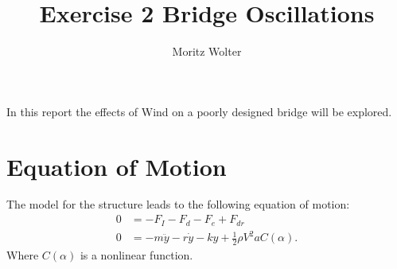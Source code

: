 




\title{Exercise 2 Bridge Oscillations}
\author{Moritz Wolter}

\maketitle

In this report the effects of Wind on a poorly designed bridge will be explored.
\section{Equation of Motion}
The model for the structure leads to the following equation of motion:
\begin{align}
0 &= - F_I - F_d - F_e + F_{dr} \\
0 &= -m \ddot{y} - r\dot{y} - ky + \frac{1}{2} \rho V^2 a C(\alpha) \label{eq:motion}.
\end{align}
Where $C(\alpha)$ is a nonlinear function.
